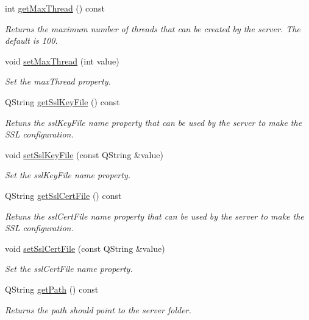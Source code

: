 \begin{DoxyCompactItemize}
int \mbox{\hyperlink{class_configuration_ad0e836129d0a7e0111b1f2c092729939}{get\+Max\+Thread}} () const
\begin{DoxyCompactList}\small\item\em Returns the maximum number of threads that can be created by the server. The default is 100. \end{DoxyCompactList}\item 
void \mbox{\hyperlink{class_configuration_ab242af54d85d49b88b778a50a77949a5}{set\+Max\+Thread}} (int value)
\begin{DoxyCompactList}\small\item\em Set the max\+Thread property. \end{DoxyCompactList}\item 
Q\+String \mbox{\hyperlink{class_configuration_a96082bdd3333d8ddf2017a95fe302225}{get\+Ssl\+Key\+File}} () const
\begin{DoxyCompactList}\small\item\em Retuns the ssl\+Key\+File name property that can be used by the server to make the S\+SL configuration. \end{DoxyCompactList}\item 
void \mbox{\hyperlink{class_configuration_a646d1ce1463b0519c745483a228c4949}{set\+Ssl\+Key\+File}} (const Q\+String \&value)
\begin{DoxyCompactList}\small\item\em Set the ssl\+Key\+File name property. \end{DoxyCompactList}\item 
Q\+String \mbox{\hyperlink{class_configuration_a10405dacfb3b61f60b290c0a5d79a8fb}{get\+Ssl\+Cert\+File}} () const
\begin{DoxyCompactList}\small\item\em Retuns the ssl\+Cert\+File name property that can be used by the server to make the S\+SL configuration. \end{DoxyCompactList}\item 
void \mbox{\hyperlink{class_configuration_a16eecdd98ab2b9c4737f3178656bb3ad}{set\+Ssl\+Cert\+File}} (const Q\+String \&value)
\begin{DoxyCompactList}\small\item\em Set the ssl\+Cert\+File name property. \end{DoxyCompactList}\item 
Q\+String \mbox{\hyperlink{class_configuration_a43acf80f787217903281b0a6d3e01e11}{get\+Path}} () const
\begin{DoxyCompactList}\small\item\em Returns the path should point to the server folder. \end{DoxyCompactList}\item 

\end{DoxyCompactItemize}
